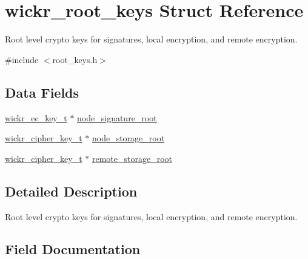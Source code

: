 \hypertarget{structwickr__root__keys}{}\section{wickr\+\_\+root\+\_\+keys Struct Reference}
\label{structwickr__root__keys}


Root level crypto keys for signatures, local encryption, and remote encryption.  




{\ttfamily \#include $<$root\+\_\+keys.\+h$>$}

\subsection*{Data Fields}
\begin{DoxyCompactItemize}
\item 
\mbox{\hyperlink{structwickr__ec__key}{wickr\+\_\+ec\+\_\+key\+\_\+t}} $\ast$ \mbox{\hyperlink{structwickr__root__keys_af3a0ca7b48b356e118dea24c26cdd9f5}{node\+\_\+signature\+\_\+root}}
\item 
\mbox{\hyperlink{structwickr__cipher__key}{wickr\+\_\+cipher\+\_\+key\+\_\+t}} $\ast$ \mbox{\hyperlink{structwickr__root__keys_ada908a5fa4aaf7c8b9a4b496c99e595a}{node\+\_\+storage\+\_\+root}}
\item 
\mbox{\hyperlink{structwickr__cipher__key}{wickr\+\_\+cipher\+\_\+key\+\_\+t}} $\ast$ \mbox{\hyperlink{structwickr__root__keys_a9bf1ff10b669493393e2bf918f5d4090}{remote\+\_\+storage\+\_\+root}}
\end{DoxyCompactItemize}


\subsection{Detailed Description}
Root level crypto keys for signatures, local encryption, and remote encryption. 

\subsection{Field Documentation}
\mbox{\label{structwickr__root__keys_af3a0ca7b48b356e118dea24c26cdd9f5}} 
